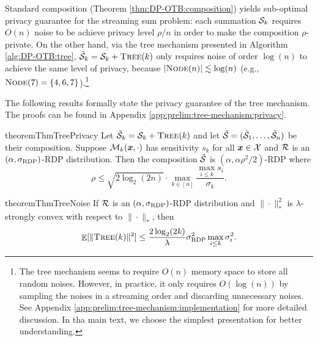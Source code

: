 Standard composition (Theorem \ref{thm:DP-OTB:composition}) yields sub-optimal privacy guarantee for the streaming sum problem: each summation ${\cal S}_k$ requires $O(n)$ noise to be achieve privacy level $\rho/n$ in order to make the composition $\rho$-private. On the other hand, via the tree mechanism presented in Algorithm \ref{alg:DP-OTB:tree}, $\tilde{{\cal S}}_k = {\cal S}_k + {\normalfont\textsc{Tree}}(k)$ only requires noise of order $\log(n)$ to achieve the same level of privacy, because $|{\normalfont\textsc{Node}}(n)|\lesssim \log(n)$ (e.g., ${\normalfont\textsc{Node}}(7)=\{4,6,7\}$).\footnote{The tree mechanism seems to require $O(n)$ memory space to store all random noises. However, in practice, it only requires $O(\log(n))$ by sampling the noises in a streaming order and discarding unnecessary noises. See Appendix \ref{app:prelim:tree-mechanism:implementation} for more detailed discussion. In tha main text, we choose the simplest presentation for better understanding.}

The following results formally state the privacy guarantee of the tree mechanism. The proofs can be found in Appendix \ref{app:prelim:tree-mechanism:privacy}.

\begin{restatable}{theorem}{ThmTreePrivacy}
\label{thm:tree-mechanism:privacy}
Let $\tilde{{\cal S}}_k = {\cal S}_k + {\normalfont\textsc{Tree}}(k)$ and let $\tilde{{\cal S}}=(\tilde{{\cal S}}_1,\ldots,\tilde{{\cal S}}_n)$ be their composition. Suppose ${\cal M}_k({\boldsymbol{x}},\cdot)$ has sensitivity $s_k$ for all ${\boldsymbol{x}}\in{\cal X}$ and ${\cal R}$ is an $(\alpha,\sigma_{\mathrm{RDP}})$-RDP distribution. Then the composition $\tilde{{\cal S}}$ is $(\alpha, \alpha\rho^2/2)$-RDP where
\begin{equation}
    \rho \le \sqrt{2\log_2(2n)} \cdot \max_{k\in[n]} \frac{\max_{i\le k} s_i}{\sigma_k}.
    \label{eq:tree-mechanism:privacy}
\end{equation}
\end{restatable}

\begin{restatable}{theorem}{ThmTreeNoise}
\label{thm:tree-mechanism:noise}
If ${\cal R}$ is an $(\alpha,\sigma_{\mathrm{RDP}})$-RDP distribution and $\|\cdot\|_\ast^2$ is $\lambda$-strongly convex with respect to $\|\cdot\|_\ast$, then
\begin{equation}
    \mathop{\mathbb{E}}[\|{\normalfont\textsc{Tree}}(k)\|^2] \le \frac{2\log_2(2k)}{\lambda} \sigma_{\mathrm{RDP}}^2 \max_{i\le k} \sigma_i^2.
    \label{eq:tree-mechanism:noise} 
\end{equation}
\end{restatable}
